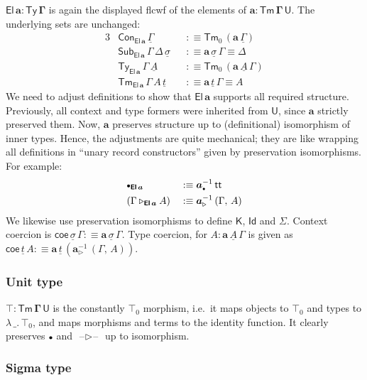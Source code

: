 \documentclass[12pt,a4paper,twoside,openany]{book}
\theoremstyle{remark}
\theoremstyle{definition}
\theoremstyle{theorem}
\newcommand{\bs}[1]{\boldsymbol{#1}}
\newcommand{\Con}{\mathsf{Con}}
\newcommand{\Sub}{\mathsf{Sub}}
\newcommand{\Tm}{\mathsf{Tm}}
\newcommand{\Ty}{\mathsf{Ty}}
\newcommand{\U}{\mathsf{U}}
\newcommand{\El}{\mathsf{El}}
\newcommand{\Id}{\mathsf{Id}}
\renewcommand{\tt}{\mathsf{tt}}
\newcommand{\blank}{\mathord{\hspace{1pt}\text{--}\hspace{1pt}}}
\newcommand{\ext}{\triangleright}
\newcommand{\emptycon}{\scaleobj{.75}\bullet}
\newcommand{\K}{\mathsf{K}}
\newcommand{\ba}{\bs{a}}
\newcommand{\bU}{\bs{\U}}
\newcommand{\bEl}{\bs{\El}}
\newcommand{\ul}[1]{\underline{#1}}
\newcommand{\ulGamma}{\ul{\Gamma}}
\newcommand{\ulsigma}{\ul{\sigma}}
\newcommand{\ult}{\ul{t}}
\newcommand{\ulA}{\ul{A}}
\newcommand{\coe}{\mathsf{coe}}
\newcommand{\defn}{:\equiv}
\begin{document}
$\bs{\El\,a : \Ty\,\Gamma}$ is again the displayed flcwf of
the elements of $\bs{a : \Tm\,\Gamma\,\U}$. The underlying sets are unchanged:
\begin{alignat*}{3}
  & \Con_{\bEl\,\ba}\,\ulGamma && \defn \Tm_0\,(\ba\,\ulGamma)\\
  & \Sub_{\bEl\,\ba}\,\Gamma\,\Delta\,\ulsigma && \defn \ba\,\ulsigma\,\Gamma \equiv \Delta\\
  & \Ty_{\bEl\,\ba}\,\Gamma\,\ulA && \defn \Tm_0\,(\ba\,\ulA\,\Gamma)\\
  & \Tm_{\bEl\,\ba}\,\Gamma\,A\,\ult && \defn \ba\,\ult\,\Gamma \equiv A
\end{alignat*}
We need to adjust definitions to show that $\bs{\El\,a}$ supports all required
structure. Previously, all context and type formers were inherited from $\bU$,
since $\ba$ strictly preserved them. Now, $\ba$ preserves structure up to
(definitional) isomorphism of inner types. Hence, the adjustments are quite
mechanical; they are like wrapping all definitions in ``unary record constructors''
given by preservation isomorphisms. For example:
\begin{alignat*}{3}
  & \emptycon_{\bEl\,\ba} && \defn \ba_{\emptycon}^{-1}\,\tt\\
  & (\Gamma\ext_{\bEl\,\ba} A) && \defn \ba_{\ext}^{-1}\,(\Gamma,\,A)
\end{alignat*}
We likewise use preservation isomorphisms to define $\K$, $\Id$ and $\Sigma$.
Context coercion is $\coe\,\ulsigma\,\Gamma \defn \ba\,\ulsigma\,\Gamma$. Type
coercion, for $A : \ba\,\ulA\,\Gamma$ is given as $\coe\,\ult\,A \defn
\ba\,\ult\,(\ba_{\ext}^{-1}\,(\Gamma,\,A))$.

\subsubsection{Unit type}

$\bs{\top : \Tm\,\Gamma\,\U}$ is the constantly $\top_0$ morphism, i.e.\ it maps
objects to $\top_0$ and types to $\lambda\,\_.\,\top_0$, and maps morphisms and
terms to the identity function. It clearly preserves $\emptycon$ and $\blank\!\ext\!\blank$
up to isomorphism.

\subsubsection{Sigma type}
\end{document}
